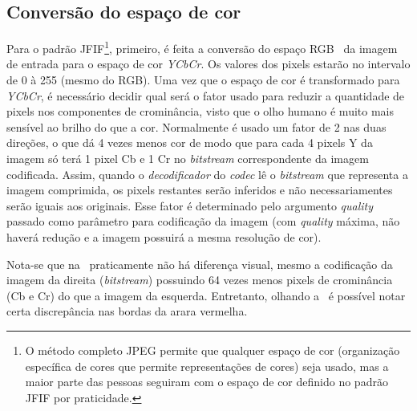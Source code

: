 \subsection{Conversão do espaço de cor}
Para o padrão \acrshort{JFIF}\footnote{O método completo JPEG permite que qualquer espaço de cor (organização específica de cores que permite representações de cores) seja usado, mas a maior parte das pessoas seguiram com o espaço de cor definido no padrão \acrshort{JFIF} por praticidade.}, primeiro, é feita a conversão do espaço RGB~\cite{opencv} da imagem de entrada para o espaço de cor \textit{YCbCr}. Os valores dos pixels estarão no intervalo de 0 à 255 (mesmo do RGB).
Uma vez que o espaço de cor é transformado para \textit{YCbCr}, é necessário decidir qual será o fator usado para reduzir a quantidade de pixels nos componentes de crominância, visto que o olho humano é muito mais sensível ao brilho do que a cor. Normalmente é usado um fator de 2 nas duas direções, o que dá 4 vezes menos cor de modo que para cada 4 pixels Y da imagem só terá 1 pixel Cb e 1 Cr no \textit{bitstream} correspondente da imagem codificada. Assim, quando o \textit{decodificador} do \textit{codec} lê o \textit{bitstream} que representa a imagem comprimida, os pixels restantes serão inferidos e não necessariamentes serão iguais aos originais. Esse fator é determinado pelo argumento \textit{quality} passado como parâmetro para codificação da imagem (com \textit{quality} máxima, não haverá redução e a imagem possuirá a mesma resolução de cor).

Nota-se que na~ praticamente não há diferença visual, mesmo a codificação da imagem da direita (\textit{bitstream}) possuindo 64 vezes menos pixels de crominância (Cb e Cr) do que a imagem da esquerda. Entretanto, olhando a~ é possível notar certa discrepância nas bordas da arara vermelha.

